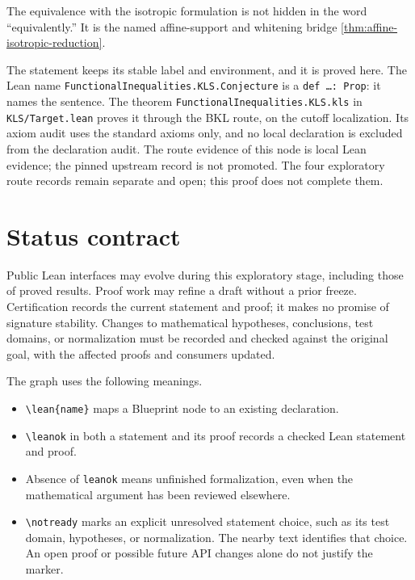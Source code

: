 The equivalence with the isotropic formulation is not hidden in the word ``equivalently.''  It is
the named affine-support and whitening bridge \cref{thm:affine-isotropic-reduction}.

The statement keeps its stable label and environment, and it is proved here.
The Lean name \texttt{FunctionalInequalities.KLS.Conjecture} is a \texttt{def \ldots : Prop}: it names the sentence.
The theorem \texttt{FunctionalInequalities.KLS.kls} in \texttt{KLS/Target.lean} proves it through the BKL route, on the
cutoff localization. Its axiom audit uses the standard axioms only, and no local declaration is excluded from the
declaration audit. The route evidence of this node is local Lean evidence; the pinned upstream record is not promoted.
The four exploratory route records remain separate and open; this proof does not complete them.

\section{Status contract}

Public Lean interfaces may evolve during this exploratory stage, including those of proved
results. Proof work may refine a draft without a prior freeze. Certification records the current
statement and proof; it makes no promise of signature stability. Changes to mathematical
hypotheses, conclusions, test domains, or normalization must be recorded and checked against
the original goal, with the affected proofs and consumers updated.

The graph uses the following meanings.

\begin{itemize}
  \item \texttt{\textbackslash lean\{name\}} maps a Blueprint node to an existing declaration.
  \item \texttt{\textbackslash leanok} in both a statement and its proof records a checked Lean
        statement and proof.
  \item Absence of \texttt{leanok} means unfinished formalization, even when the mathematical
        argument has been reviewed elsewhere.
  \item \texttt{\textbackslash notready} marks an explicit unresolved statement choice, such as
        its test domain, hypotheses, or normalization. The nearby text identifies that choice.
        An open proof or possible future API changes alone do not justify the marker.
\end{itemize}

